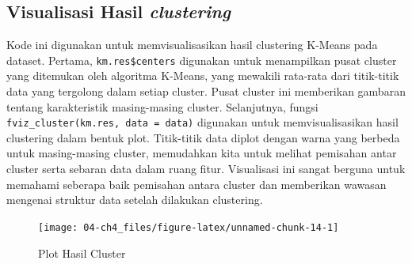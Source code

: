 \documentclass[
  oneside]{book}
\newenvironment{Shaded}{\begin{snugshade}}{\end{snugshade}}
\newcommand{\AttributeTok}[1]{\textcolor[rgb]{0.13,0.29,0.53}{#1}}
\newcommand{\CommentTok}[1]{\textcolor[rgb]{0.56,0.35,0.01}{\textit{#1}}}
\newcommand{\FunctionTok}[1]{\textcolor[rgb]{0.13,0.29,0.53}{\textbf{#1}}}
\newcommand{\NormalTok}[1]{#1}
\newcommand{\SpecialCharTok}[1]{\textcolor[rgb]{0.81,0.36,0.00}{\textbf{#1}}}
\begin{document}
\subsection*{\texorpdfstring{Visualisasi Hasil \emph{clustering}}{Visualisasi Hasil clustering}}\label{visualisasi-hasil-clustering}

Kode ini digunakan untuk memvisualisasikan hasil clustering K-Means pada dataset. Pertama, \texttt{km.res\$centers} digunakan untuk menampilkan pusat cluster yang ditemukan oleh algoritma K-Means, yang mewakili rata-rata dari titik-titik data yang tergolong dalam setiap cluster. Pusat cluster ini memberikan gambaran tentang karakteristik masing-masing cluster. Selanjutnya, fungsi \texttt{fviz\_cluster(km.res,\ data\ =\ data)} digunakan untuk memvisualisasikan hasil clustering dalam bentuk plot. Titik-titik data diplot dengan warna yang berbeda untuk masing-masing cluster, memudahkan kita untuk melihat pemisahan antar cluster serta sebaran data dalam ruang fitur. Visualisasi ini sangat berguna untuk memahami seberapa baik pemisahan antara cluster dan memberikan wawasan mengenai struktur data setelah dilakukan clustering.

\begin{Shaded}
\end{Shaded}

\begin{figure}[h]

{\centering \texttt{[image: 04-ch4\_files/figure-latex/unnamed-chunk-14-1]} 

}

\caption{Plot Hasil Cluster}\label{fig:unnamed-chunk-14}
\end{figure}
\end{document}
